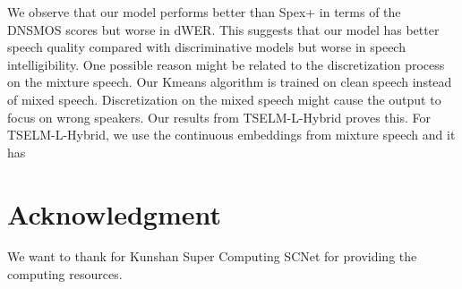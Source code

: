 \documentclass[conference]{IEEEtran}
\begin{document}
We observe that our model performs better than Spex+ in terms of the DNSMOS scores but worse in dWER. 
This suggests that our model has better speech quality compared with discriminative models but 
worse in speech intelligibility. One possible reason might be related 
to the discretization process on the mixture 
speech. Our Kmeans algorithm is trained on clean speech instead of mixed speech. 
Discretization on the mixed
speech might cause the output to focus on wrong speakers. Our results from TSELM-L-Hybrid proves this. For TSELM-L-Hybrid, we use the continuous 
embeddings from mixture speech and it has 





\section*{Acknowledgment}

We want to thank for Kunshan Super Computing SCNet for providing the computing resources. 



\end{document}
